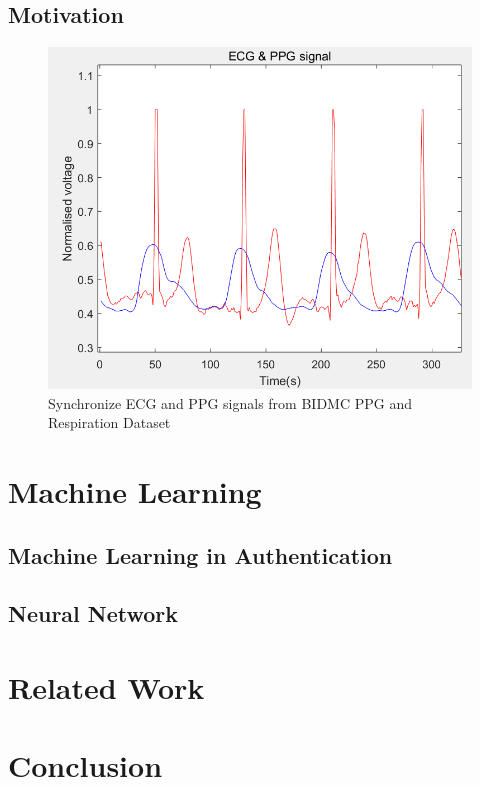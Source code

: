 \documentclass[a4paper,12pt]{article}
\begin{document}
\subsection{Motivation}

\begin{figure}[H]
\centering
\includegraphics[width = .8\textwidth]{ecg_ppg.PNG}
\caption{Synchronize ECG and PPG signals from BIDMC PPG and Respiration Dataset\autocite{PhysioNet}}
\label{fig:ppg_ecg}
\end{figure}

\section{Machine Learning}
\subsection{Machine Learning in Authentication}
\subsection{Neural Network}

\section{Related Work}

\section{Conclusion}

\printbibliography
\end{document}
